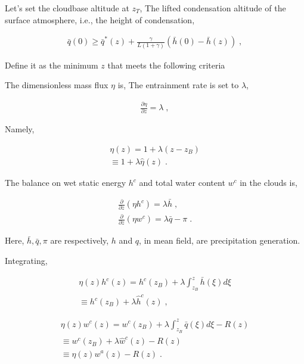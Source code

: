 Let's set the cloudbase altitude at \(z_T\), The lifted condensation
altitude of the surface atmosphere, i.e., the height of condensation,

\begin{eqnarray}
   \bar{q}(0) \geq
                \bar{q}^*(z)
                + \frac{\gamma}{L(1+\gamma)} 
                    \left(\bar{h}(0)-\bar{h}(z) \right) \; , 
\end{eqnarray}

Define it as the minimum \(z\) that meets the following criteria

The dimensionless mass flux \(\eta\) is, The entrainment rate is set to
\(\lambda\),

\begin{eqnarray}
  \frac{\partial \eta}{\partial z} = \lambda \; ,
\end{eqnarray}

Namely,

\begin{eqnarray}
  \eta (z)  =  1 + \lambda ( z - z_B ) \\
            \equiv  1 + \lambda \hat{\eta}(z)  \; .
\end{eqnarray}

The balance on wet static energy \(h^c\) and total water content \(w^c\)
in the clouds is,

\begin{eqnarray}
  \frac{\partial }{\partial z}( \eta h^c   )  =  \lambda \bar{h}      \; , \\
  \frac{\partial }{\partial z}( \eta w^c   )  =  \lambda \bar{q} - \pi  \; .
\end{eqnarray}

Here, \(\bar{h}, \bar{q}, \pi\) are respectively, \(h\) and \(q\), in
mean field, are precipitation generation.

Integrating,

\begin{eqnarray}
   \eta (z) h^c(z)  =  h^c(z_B)
                         + \lambda \int_{z_B}^{z} \bar{h}(\xi) d\xi \\
                    \equiv  h^c(z_B) + \lambda \hat{h}^c(z) \; ,
\end{eqnarray}

\begin{eqnarray}
   \eta (z) w^c(z)  =  w^c(z_B)
                         + \lambda \int_{z_B}^{z} \bar{q}(\xi) d\xi
                         - R(z) \\
                    \equiv  w^c(z_B) + \lambda \hat{w}^c(z) 
                              - R(z)             \\
                    \equiv  \eta(z) w^a(z) - R(z)  \; . 
\end{eqnarray}

